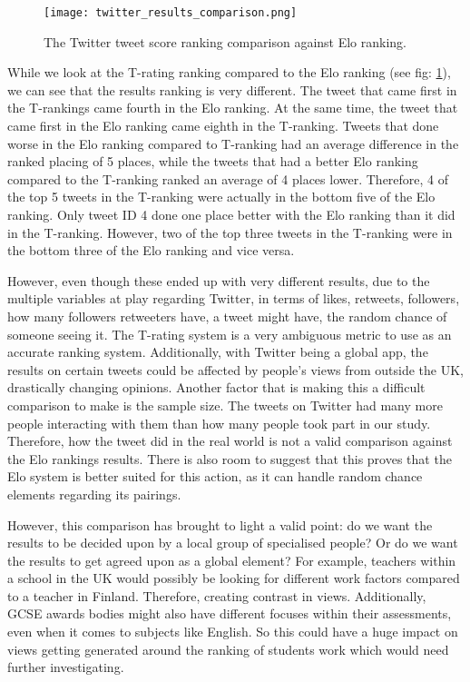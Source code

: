 	\begin{figure}[t]
		\centering
		\texttt{[image: twitter\_results\_comparison.png]}
		\caption{The Twitter tweet score ranking comparison against Elo ranking.}
		\label{fig:twitter_results_comparison}
		
	\end{figure}

	While we look at the T-rating ranking compared to the Elo ranking (see fig: \ref{fig:twitter_results_comparison}), we can see that the results ranking is very different. The tweet that came first in the T-rankings came fourth in the Elo ranking. At the same time, the tweet that came first in the Elo ranking came eighth in the T-ranking.  Tweets that done worse in the Elo ranking compared to T-ranking had an average difference in the ranked placing of 5 places, while the tweets that had a better Elo ranking compared to the T-ranking ranked an average of 4 places lower. Therefore, 4 of the top 5 tweets in the T-ranking were actually in the bottom five of the Elo ranking. Only tweet ID 4 done one place better with the Elo ranking than it did in the T-ranking. However, two of the top three tweets in the T-ranking were in the bottom three of the Elo ranking and vice versa.
	
	However, even though these ended up with very different results, due to the multiple variables at play regarding Twitter, in terms of likes, retweets, followers, how many followers retweeters have, a tweet might have, the random chance of someone seeing it. The T-rating system is a very ambiguous metric to use as an accurate ranking system. Additionally, with Twitter being a global app, the results on certain tweets could be affected by people's views from outside the UK, drastically changing opinions. Another factor that is making this a difficult comparison to make is the sample size. The tweets on Twitter had many more people interacting with them than how many people took part in our study. Therefore, how the tweet did in the real world is not a valid comparison against the Elo rankings results. There is also room to suggest that this proves that the Elo system is better suited for this action, as it can handle random chance elements regarding its pairings. 
	
	However, this comparison has brought to light a valid point: do we want the results to be decided upon by a local group of specialised people? Or do we want the results to get agreed upon as a global element? For example, teachers within a school in the UK would possibly be looking for different work factors compared to a teacher in Finland. Therefore, creating contrast in views. Additionally, GCSE awards bodies might also have different focuses within their assessments, even when it comes to subjects like English. So this could have a huge impact on views getting generated around the ranking of students work which would need further investigating.

